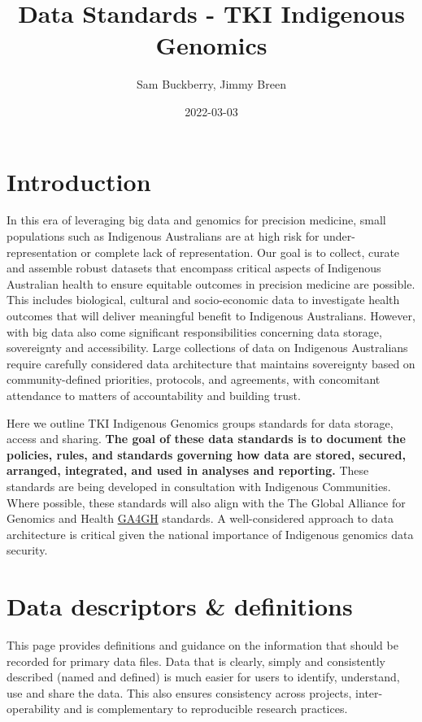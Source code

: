 \documentclass[
  11pt,
]{book}
\title{Data Standards - TKI Indigenous Genomics}
\author{Sam Buckberry, Jimmy Breen}
\date{2022-03-03}
\begin{document}
\maketitle

{
\hypersetup{linkcolor=}
\setcounter{tocdepth}{1}
\tableofcontents
}
\listoffigures
\listoftables
\hypertarget{introduction}{%
\chapter{Introduction}\label{introduction}}

In this era of leveraging big data and genomics for precision medicine, small populations such as Indigenous Australians are at high risk for under-representation or complete lack of representation. Our goal is to collect, curate and assemble robust datasets that encompass critical aspects of Indigenous Australian health to ensure equitable outcomes in precision medicine are possible. This includes biological, cultural and socio-economic data to investigate health outcomes that will deliver meaningful benefit to Indigenous Australians. However, with big data also come significant responsibilities concerning data storage, sovereignty and accessibility. Large collections of data on Indigenous Australians require carefully considered data architecture that maintains sovereignty based on community-defined priorities, protocols, and agreements, with concomitant attendance to matters of accountability and building trust.

Here we outline TKI Indigenous Genomics groups standards for data storage, access and sharing. \textbf{The goal of these data standards is to document the policies, rules, and standards governing how data are stored, secured, arranged, integrated, and used in analyses and reporting.} These standards are being developed in consultation with Indigenous Communities. Where possible, these standards will also align with the The Global Alliance for Genomics and Health \href{https://www.ga4gh.org/}{GA4GH} standards. A well-considered approach to data architecture is critical given the national importance of Indigenous genomics data security.

\hypertarget{data-descriptors-definitions}{%
\chapter{Data descriptors \& definitions}\label{data-descriptors-definitions}}

This page provides definitions and guidance on the information that should be recorded for primary data files. Data that is clearly, simply and consistently described (named and defined) is much easier for users to identify, understand, use and share the data. This also ensures consistency across projects, inter-operability and is complementary to reproducible research practices.
\end{document}
